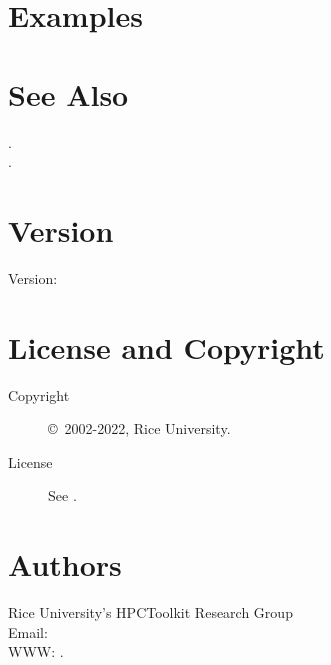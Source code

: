 \documentclass[english]{article}
\begin{document}
\section{Examples}






\section{See Also}

.\\
.\\

\section{Version}

Version: \Version

\section{License and Copyright}

\begin{description}
\item[Copyright] \copyright\ 2002-2022, Rice University.
\item[License] See .
\end{description}

\section{Authors}

\noindent
Rice University's HPCToolkit Research Group \\
Email:  \\
WWW: .

\LatexManEnd
\end{document}
